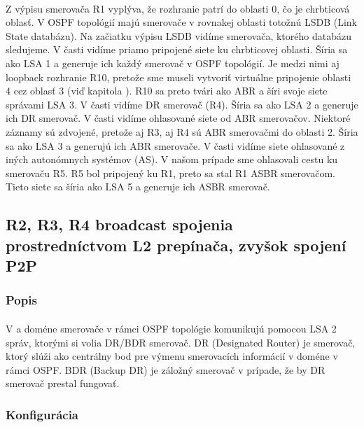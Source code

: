 \documentclass[12pt,twoside,a4paper]{report}
\begin{document}
\paragraph{}
Z výpisu  smerovača R1 vyplýva, že rozhranie  patrí do oblasti 0, čo je chrbticová oblasť. V OSPF topológií majú smerovače v rovnakej oblasti totožnú LSDB (Link State databázu). Na začiatku výpisu LSDB vidíme  smerovača, ktorého databázu sledujeme. V časti  vidíme priamo pripojené siete ku chrbticovej oblasti. Šíria sa ako LSA 1 a generuje ich každý smerovač v OSPF topológií. Je medzi nimi aj loopback rozhranie R10, pretože sme museli vytvoriť virtuálne pripojenie oblasti 4 cez oblasť 3 (viď kapitola ). R10 sa preto tvári ako ABR a šíri svoje siete správami LSA 3. V časti  vidíme DR smerovač (R4). Šíria sa ako LSA 2 a generuje ich DR smerovač. V časti  vidíme ohlasované siete od ABR smerovačov. Niektoré záznamy sú zdvojené, pretože aj R3, aj R4 sú ABR smerovačmi do oblasti 2. Šíria sa ako LSA 3 a generujú ich ABR smerovače. V časti  vidíme siete ohlasované z iných autonómnych systémov (AS). V našom prípade sme ohlasovali cestu ku smerovaču R5. R5 bol pripojený ku R1, preto sa stal R1 ASBR smerovačom. Tieto siete sa šíria ako LSA 5 a generuje ich ASBR smerovač.



\subsection{R2, R3, R4 broadcast spojenia prostredníctvom L2 prepínača, zvyšok spojení P2P}
\subsubsection{Popis}
\paragraph{}
V  a  doméne smerovače v rámci OSPF topológie komunikujú pomocou LSA 2 správ, ktorými si volia DR/BDR smerovač. DR (Designated Router) je smerovač, ktorý slúži ako centrálny bod pre výmenu smerovacích informácií v  doméne v rámci OSPF. BDR (Backup DR) je záložný smerovač v prípade, že by DR smerovač prestal fungovať.

\subsubsection{Konfigurácia}
\end{document}
